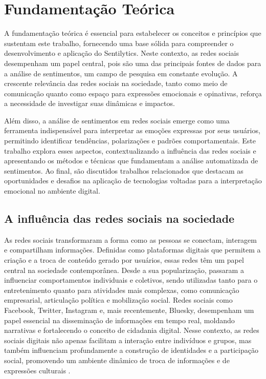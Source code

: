 \documentclass[
	12pt,				%
	oneside,			%
	a4paper,			%
	english,			%
	french,				%
	spanish,			%
	brazil				%
	]{abntex2}
\begin{document}
\hypertarget{fundamentauxe7uxe3o-teuxf3rica}{%
\chapter{Fundamentação Teórica}\label{fundamentauxe7uxe3o-teuxf3rica}}

A fundamentação teórica é essencial para estabelecer os conceitos e
princípios que sustentam este trabalho, fornecendo uma base sólida para
compreender o desenvolvimento e aplicação do Sentilytics. Neste
contexto, as redes sociais desempenham um papel central, pois são uma
das principais fontes de dados para a análise de sentimentos, um campo
de pesquisa em constante evolução. A crescente relevância das redes
sociais na sociedade, tanto como meio de comunicação quanto como espaço
para expressões emocionais e opinativas, reforça a necessidade de
investigar suas dinâmicas e impactos.

Além disso, a análise de sentimentos em redes sociais emerge como uma
ferramenta indispensável para interpretar as emoções expressas por seus
usuários, permitindo identificar tendências, polarizações e padrões
comportamentais. Este trabalho explora esses aspectos, contextualizando
a influência das redes sociais e apresentando os métodos e técnicas que
fundamentam a análise automatizada de sentimentos. Ao final, são
discutidos trabalhos relacionados que destacam as oportunidades e
desafios na aplicação de tecnologias voltadas para a interpretação
emocional no ambiente digital.

\hypertarget{a-influuxeancia-das-redes-sociais-na-sociedade}{%
\section{A influência das redes sociais na
sociedade}\label{a-influuxeancia-das-redes-sociais-na-sociedade}}

As redes sociais transformaram a forma como as pessoas se conectam,
interagem e compartilham informações. Definidas como plataformas
digitais que permitem a criação e a troca de conteúdo gerado por
usuários, essas redes têm um papel central na sociedade contemporânea.
Desde a sua popularização, passaram a influenciar comportamentos
individuais e coletivos, sendo utilizadas tanto para o entretenimento
quanto para atividades mais complexas, como comunicação empresarial,
articulação política e mobilização social. Redes sociais como Facebook,
Twitter, Instagram e, mais recentemente, Bluesky, desempenham um papel
essencial na disseminação de informações em tempo real, moldando
narrativas e fortalecendo o conceito de cidadania digital. Nesse
contexto, as redes sociais digitais não apenas facilitam a interação
entre indivíduos e grupos, mas também influenciam profundamente a
construção de identidades e a participação social, promovendo um
ambiente dinâmico de troca de informações e de expressões culturais
\cite{pompei2021redes}.
\end{document}
